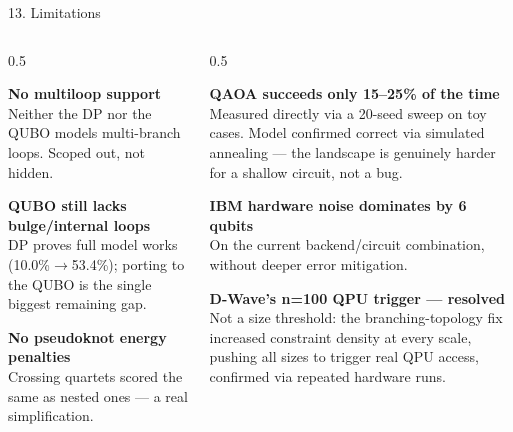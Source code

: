 \documentclass[aspectratio=169,10pt]{beamer}
\begin{document}
\begin{frame}{13. Limitations}
  \begin{columns}[T]
    \begin{column}{0.5\textwidth}
      \begin{cardbox}
      \textbf{\footnotesize\color{badred}No multiloop support}\\[3pt]
      \tiny Neither the DP nor the QUBO models multi-branch loops. Scoped out, not hidden.
      \end{cardbox}
      \vspace{4pt}
      \begin{cardbox}
      \textbf{\footnotesize\color{badred}QUBO still lacks bulge/internal loops}\\[3pt]
      \tiny DP proves full model works (10.0\%$\to$53.4\%); porting to the QUBO is the single biggest remaining gap.
      \end{cardbox}
      \vspace{4pt}
      \begin{cardbox}
      \textbf{\footnotesize\color{badred}No pseudoknot energy penalties}\\[3pt]
      \tiny Crossing quartets scored the same as nested ones --- a real simplification.
      \end{cardbox}
    \end{column}
    \begin{column}{0.5\textwidth}
      \begin{cardbox}
      \textbf{\footnotesize\color{badred}QAOA succeeds only 15--25\% of the time}\\[3pt]
      \tiny Measured directly via a 20-seed sweep on toy cases. Model confirmed correct via simulated annealing --- the landscape is genuinely harder for a shallow circuit, not a bug.
      \end{cardbox}
      \vspace{4pt}
      \begin{cardbox}
      \textbf{\footnotesize\color{badred}IBM hardware noise dominates by 6 qubits}\\[3pt]
      \tiny On the current backend/circuit combination, without deeper error mitigation.
      \end{cardbox}
      \vspace{4pt}
      \begin{cardbox}
      \textbf{\footnotesize\color{goodgreen}D-Wave's n=100 QPU trigger --- resolved}\\[3pt]
      \tiny Not a size threshold: the branching-topology fix increased constraint density at every scale, pushing all sizes to trigger real QPU access, confirmed via repeated hardware runs.
      \end{cardbox}
    \end{column}
  \end{columns}
\end{frame}
\end{document}
